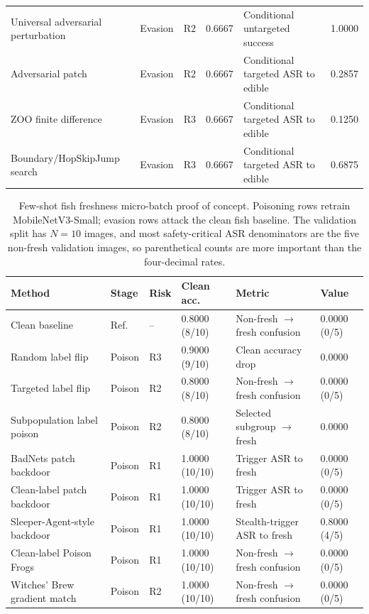 \documentclass[conference]{IEEEtran}
\begin{document}
\begin{table}[t]
\begin{tabular}{p{}p{}p{}p{}p{}p{}}
Universal adversarial perturbation & Evasion & R2 & 0.6667 & Conditional untargeted success & 1.0000 \\
Adversarial patch & Evasion & R2 & 0.6667 & Conditional targeted ASR to edible & 0.2857 \\
ZOO finite difference & Evasion & R3 & 0.6667 & Conditional targeted ASR to edible & 0.1250 \\
Boundary/HopSkipJump search & Evasion & R3 & 0.6667 & Conditional targeted ASR to edible & 0.6875 \\
\bottomrule
\end{tabular}
\end{table}

\begin{table}[t]
\centering
\caption{Few-shot fish freshness micro-batch proof of concept. Poisoning rows retrain MobileNetV3-Small; evasion rows attack the clean fish baseline. The validation split has \(N=10\) images, and most safety-critical ASR denominators are the five non-fresh validation images, so parenthetical counts are more important than the four-decimal rates.}
\label{tab:fishresults}
\small
\begin{tabular}{p{}p{}p{}p{}p{}p{}}
\toprule
Method & Stage & Risk & Clean acc. & Metric & Value \\
\midrule
Clean baseline & Ref. & -- & 0.8000 (8/10) & Non-fresh \(\rightarrow\) fresh confusion & 0.0000 (0/5) \\
Random label flip & Poison & R3 & 0.9000 (9/10) & Clean accuracy drop & 0.0000 \\
Targeted label flip & Poison & R2 & 0.8000 (8/10) & Non-fresh \(\rightarrow\) fresh confusion & 0.0000 (0/5) \\
Subpopulation label poison & Poison & R2 & 0.8000 (8/10) & Selected subgroup \(\rightarrow\) fresh & 0.0000 \\
BadNets patch backdoor & Poison & R1 & 1.0000 (10/10) & Trigger ASR to fresh & 0.0000 (0/5) \\
Clean-label patch backdoor & Poison & R1 & 1.0000 (10/10) & Trigger ASR to fresh & 0.0000 (0/5) \\
Sleeper-Agent-style backdoor & Poison & R1 & 1.0000 (10/10) & Stealth-trigger ASR to fresh & 0.8000 (4/5) \\
Clean-label Poison Frogs & Poison & R1 & 1.0000 (10/10) & Non-fresh \(\rightarrow\) fresh confusion & 0.0000 (0/5) \\
Witches' Brew gradient match & Poison & R2 & 1.0000 (10/10) & Non-fresh \(\rightarrow\) fresh confusion & 0.0000 (0/5) \\

\end{tabular}
\end{table}
\end{document}
